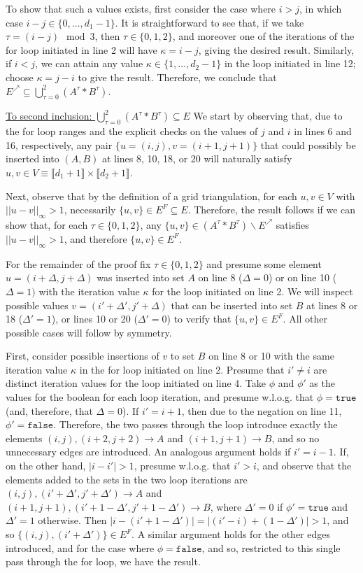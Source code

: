 \documentclass[opre,nonblindrev]{informs3} %
\begin{document}
{To show that such a values exists, first consider the case where $i > j$, in which case $i - j \in \{0,\ldots,d_1-1\}$. It is straightforward to see that, if we take $\tau = (i-j)\mod 3$, then $\tau \in \{0,1,2\}$, and moreover one of the iterations of the for loop initiated in line 2 will have $\kappa = i-j$, giving the desired result. Similarly, if $i < j$, we can attain any value $\kappa \in \{1,\ldots,d_2-1\}$ in the loop initiated in line 12; choose $\kappa = j - i$ to give the result. Therefore, we conclude that $E^\nearrow \subseteq \bigcup_{\tau=0}^2 (A^\tau * B^\tau)$.

\underline{To second inclusion: $\bigcup_{\tau=0}^2 (A^\tau * B^\tau) \subseteq E$} We start by observing that, due to the for loop ranges and the explicit checks on the values of $j$ and $i$ in lines 6 and 16, respectively, any pair $\{u=(i,j),v=(i+1,j+1)\}$ that could possibly be inserted into $(A,B)$ at lines 8, 10, 18, or 20 will naturally satisfy $u,v \in V \equiv \llbracket d_1 + 1 \rrbracket \times \llbracket d_2 + 1 \rrbracket$.

Next, observe that by the definition of a grid triangulation, for each $u,v \in V$ with $||u-v||_\infty > 1$, necessarily $\{u,v\} \in E^F \subseteq E$. Therefore, the result follows if we can show that, for each $\tau \in \{0,1,2\}$, any $\{u,v\} \in (A^\tau * B^\tau) \backslash E^\nearrow$ satisfies $||u-v||_\infty > 1$, and therefore $\{u,v\} \in E^F$.

For the remainder of the proof fix $\tau \in \{0,1,2\}$ and presume some element $u=(i+\Delta,j+\Delta)$ was inserted into set $A$ on line 8 ($\Delta=0$) or on line 10 ($\Delta=1)$ with the iteration value $\kappa$ for the loop initiated on line 2. We will inspect possible values $v = (i'+\Delta',j'+\Delta)$ that can be inserted into set $B$ at lines 8 or 18 ($\Delta'=1$), or lines 10 or 20 ($\Delta'=0$) to verify that $\{u,v\} \in E^F$. All other possible cases will follow by symmetry.

First, consider possible insertions of $v$ to set $B$ on line 8 or 10 with the same iteration value $\kappa$ in the for loop initiated on line 2. Presume that $i' \neq i$ are distinct iteration values for the loop initiated on line 4. Take $\phi$ and $\phi'$ as the values for the boolean for each loop iteration, and presume w.l.o.g. that $\phi=\texttt{true}$ (and, therefore, that $\Delta=0$). If $i'=i+1$, then due to the negation on line 11, $\phi' = \texttt{false}$. Therefore, the two passes through the loop introduce exactly the elements $(i,j), (i+2,j+2) \to A$ and $(i+1,j+1) \to B$, and so no unnecessary edges are introduced. An analogous argument holds if $i'=i-1$. If, on the other hand, $|i-i'| > 1$, presume w.l.o.g. that $i' > i$, and observe that the elements added to the sets in the two loop iterations are $(i,j), (i'+\Delta',j'+\Delta') \to A$ and $(i+1,j+1), (i'+1-\Delta',j'+1-\Delta') \to B$, where $\Delta'=0$ if $\phi' = \texttt{true}$ and $\Delta'=1$ otherwise. Then $|i-(i'+1-\Delta')| = |(i'-i)+(1-\Delta')| > 1$, and so $\{(i,j),(i'+\Delta')\} \in E^F$. A similar argument holds for the other edges introduced, and for the case where $\phi=\texttt{false}$, and so, restricted to this single pass through the for loop, we have the result.

}
\end{document}

